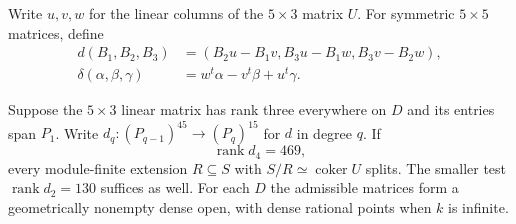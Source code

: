 Write $u,v,w$ for the linear columns of the $5\times3$ matrix $U$.
For symmetric $5\times5$ matrices, define
\begin{align*}
 d(B_1,B_2,B_3)&=(B_2u-B_1v,B_3u-B_1w,B_3v-B_2w),\\
 \delta(\alpha,\beta,\gamma)&=w^t\alpha-v^t\beta+u^t\gamma .
\end{align*}
\begin{theorem}\label{three-relation-criterion}
Suppose the $5\times3$ linear matrix has rank three everywhere on $D$ and its entries span $P_1$. Write
$d_q:(P_{q-1})^{45}\to(P_q)^{15}$ for $d$ in degree $q$. If
\[
                   \operatorname{rank} d_4=469,
\]
every module-finite extension $R\subseteq S$ with $S/R\simeq\operatorname{coker}U$ splits. The smaller test $\operatorname{rank}d_2=130$ suffices as well. For each $D$ the admissible matrices form a geometrically nonempty dense open, with dense rational points when $k$ is infinite.
\end{theorem}
